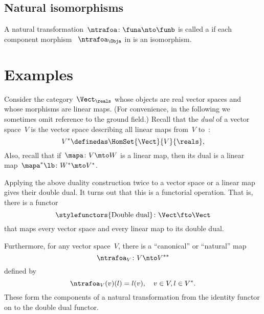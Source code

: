 \subsection{Natural isomorphisms}


\begin{ctdefinition}
    \label{def:nat_iso}
    A natural transformation~$\ntrafoa \colon \funa \nto \funb $ is called a \emph{} if each component morphism ~$\ntrafoa_\Obja$ in \CatD is an isomorphism.
\end{ctdefinition}
\clearpage

\section{Examples}

\begin{example}
    \label{ex:Vect}
    Consider the category~$\Vect_{\reals}$ whose objects are real vector spaces and whose morphisms are linear maps.
    (For convenience, in the following we sometimes omit reference to the ground field.)
    Recall that the \emph{dual} of a vector space~$V$ is the vector space describing all linear maps from~$V$ to~\reals:
    \begin{equation}
        \label{eq:dual-vector-space}
        V^* \definedas \HomSet{\Vect}{V}{\reals},
    \end{equation}
    Also, recall that if~$\mapa\colon V \mto W$ is a linear map, then its dual is a linear map~$\mapa^* \lb  \colon W^* \mto V^*$.

    Applying the above duality construction twice to a vector space or a linear map gives their double dual.
    It turns out that this is a functorial operation.
    That is, there is a functor
    \begin{equation}
        \label{eq:double-dual-functor}
        \text{\stylefunctors{Double dual}}\colon \Vect \fto \Vect
    \end{equation}
    that maps every vector space and every linear map to its double dual.

    Furthermore, for any vector space~$V$, there is a ``canonical'' or ``natural'' map~
    \begin{equation}
        \ntrafoa_V \colon V \nto V^{**}
    \end{equation}
    defined by
    \begin{equation}
        \label{eq:natural-trafo-to-double-dual}
        \ntrafoa_V(v)(l) = l(v), \quad  v \in V, l \in V^*.
    \end{equation}
    These form the components of a natural transformation from the identity functor on \Vect to the double dual functor.
    \begin{center}
    \end{center}
\end{example}

